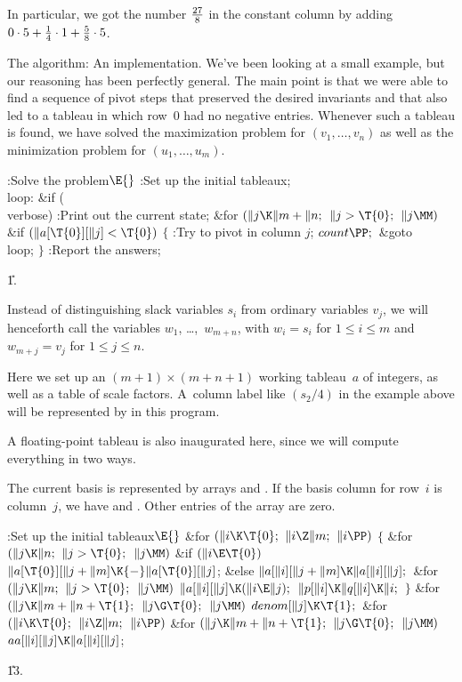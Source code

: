 In particular, we got the number ${27\over8}$ in the constant column
by adding $0\cdot 5+{1\over4}\cdot1+{5\over8}\cdot5$.

\fi

The algorithm: An implementation.
We've been looking at a small example, but our reasoning has been perfectly
general. The main point is that we were able to find a sequence of pivot steps
that preserved the desired invariants and that also led to a tableau
in which row~0 had no negative entries. Whenever such a tableau is
found, we have solved the maximization problem for $(v_1,\ldots,v_n)$
as well as the minimization problem for $(u_1,\ldots,u_m)$.

\Y\B\4:Solve the problem\X${}\E{}$\6
:Set up the initial tableaux\X;\6
\4\\{loop}:\5
\&{if} (\\{verbose})\1\5
:Print out the current state\X;\2\6
\&{for} ${}(\|j\K\|m+\|n;{}$ ${}\|j>\T{0};{}$ ${}\|j\MM){}$\1\6
\&{if} ${}(\|a[\T{0}][\|j]<\T{0}){}$\5
${}\{{}$\1\6
:Try to pivot in column $j$\X;\6
${}\\{count}\PP;{}$\6
\&{goto} \\{loop};\6
\4${}\}{}$\2\2\6
:Report the answers\X;\par
\U1.\fi

Instead of distinguishing slack variables $s_i$ from ordinary variables
$v_j$, we will henceforth call the variables $w_1$, \dots,~$w_{m+n}$,
with $w_i=s_i$ for $1\le i\le m$ and $w_{m+j}=v_j$ for $1\le j\le n$.

Here we set up an $(m+1)\times(m+n+1)$ working tableau~$a$ of integers, as
well as a table of scale factors. A~column label like $(s_2/4)$ in the
example above will be represented by  in this
program.

A floating-point tableau  is also inaugurated here, since we will
compute everything in two ways.

The current basis is represented by arrays  and . If the basis
column for row~$i$ is column~$j$, we have  and .
Other entries of the  array are zero.

\Y\B\4:Set up the initial tableaux\X${}\E{}$\6
\&{for} ${}(\|i\K\T{0};{}$ ${}\|i\Z\|m;{}$ ${}\|i\PP){}$\5
${}\{{}$\1\6
\&{for} ${}(\|j\K\|n;{}$ ${}\|j>\T{0};{}$ ${}\|j\MM){}$\1\6
\&{if} ${}(\|i\E\T{0}){}$\1\5
${}\|a[\T{0}][\|j+\|m]\K{-}\|a[\T{0}][\|j]{}$;\5
\2\&{else}\1\5
${}\|a[\|i][\|j+\|m]\K\|a[\|i][\|j];{}$\2\2\6
\&{for} ${}(\|j\K\|m;{}$ ${}\|j>\T{0};{}$ ${}\|j\MM){}$\1\5
${}\|a[\|i][\|j]\K(\|i\E\|j);{}$\2\6
${}\|p[\|i]\K\|q[\|i]\K\|i;{}$\6
\4${}\}{}$\2\6
\&{for} ${}(\|j\K\|m+\|n+\T{1};{}$ ${}\|j\G\T{0};{}$ ${}\|j\MM){}$\1\5
${}\\{denom}[\|j]\K\T{1};{}$\2\6
\&{for} ${}(\|i\K\T{0};{}$ ${}\|i\Z\|m;{}$ ${}\|i\PP){}$\1\6
\&{for} ${}(\|j\K\|m+\|n+\T{1};{}$ ${}\|j\G\T{0};{}$ ${}\|j\MM){}$\1\5
${}\\{aa}[\|i][\|j]\K\|a[\|i][\|j]{}$;\2\2\par
\U13.\fi

